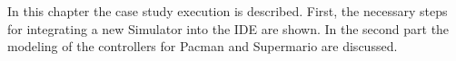 
In this chapter the case study execution is described. First, the necessary steps for integrating a new Simulator into the IDE are shown. In the second part the modeling of the controllers for Pacman and Supermario are discussed.




